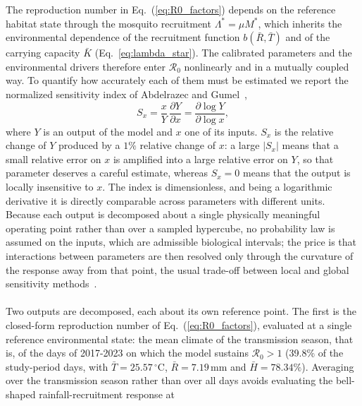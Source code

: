 \documentclass[a4paper,fleqn]{cas-dc}
\begin{document}
The reproduction number in Eq.~(\ref{eq:R0_factors}) depends on the
reference habitat state through the mosquito recruitment
$\Lambda^* = \mu M^*$, which inherits the environmental dependence of the
recruitment function $b(\bar{R},\bar{T})$ and of the carrying capacity
$\bar{K}$ (Eq.~\ref{eq:lambda_star}). The calibrated parameters and the
environmental drivers therefore enter $\mathcal{R}_0$ nonlinearly and in a
mutually coupled way. To quantify how accurately each of them must be
estimated we report the normalized sensitivity index of Abdelrazec and
Gumel~\cite{math_assessment_of_the_role_of_temp_and_rainfall},
\begin{equation}
S_x = \frac{x}{Y}\,\frac{\partial Y}{\partial x}= \frac{\partial \log Y}{\partial \log x},
\label{eq:normalized_sensitivity}
\end{equation}
where $Y$ is an output of the model and $x$ one of its inputs. $S_x$ is the
relative change of $Y$ produced by a $1\%$ relative change of $x$: a large
$|S_x|$ means that a small relative error on $x$ is amplified into a large
relative error on $Y$, so that parameter deserves a careful estimate, whereas
$S_x = 0$ means that the output is locally insensitive to $x$. The index is
dimensionless, and being a logarithmic derivative it is directly comparable
across parameters with different units. Because each output is decomposed
about a single physically meaningful operating point rather than over a
sampled hypercube, no probability law is assumed on the inputs, which are
admissible biological intervals; the price is that interactions between
parameters are then resolved only through the curvature of the response
away from that point, the usual trade-off between local and global
sensitivity methods~\cite{cariboni2007}.
\\\\
Two outputs are decomposed, each about its own reference point. The first is
the closed-form reproduction number of Eq.~(\ref{eq:R0_factors}), evaluated
at a single reference environmental state: the mean climate of the
transmission season, that is, of the days of 2017-2023 on which the model
sustains $\mathcal{R}_0 > 1$ (39.8\% of the study-period days, with
$\bar{T} = 25.57\,^{\circ}\mathrm{C}$, $\bar{R} = 7.19\,\mathrm{mm}$ and
$\bar{H} = 78.34\%$). Averaging over the transmission season rather than over
all days avoids evaluating the bell-shaped rainfall-recruitment response at
\end{document}
